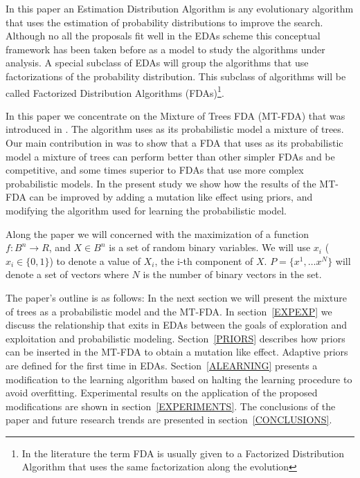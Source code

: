 \documentclass[runningheads]{llncs}
\begin{document}
 In this paper  an
   Estimation Distribution Algorithm is any evolutionary algorithm
    that uses the estimation of probability distributions to improve
    the search. Although no all the
   proposals fit well in the EDAs scheme this conceptual framework has been taken before
   \cite{Larranhaga_et_Lozano:2001}
    as a model to study the algorithms  under analysis. A special subclass of EDAs will group the
    algorithms that use factorizations of the probability
    distribution. This subclass of algorithms will be called Factorized
    Distribution Algorithms (FDAs)\footnote{In the literature the term FDA
    is usually given to a Factorized Distribution
    Algorithm that uses the same factorization along the evolution}.


In this paper we concentrate on the  Mixture of Trees FDA (MT-FDA) that was
 introduced in \cite{Santana_et_al:2001b}. The
 algorithm uses as its probabilistic model a mixture of trees. Our main contribution in \cite{Santana_et_al:2001b} was to show that a FDA that uses
as its probabilistic model a  mixture of trees can perform better than other simpler
FDAs and be competitive, and some times superior to FDAs that use more complex
probabilistic models. In the present study we show how the results of the MT-FDA can
 be improved by adding a mutation like effect using priors, and modifying
 the algorithm used for learning the probabilistic model.


 Along the paper we will concerned with the
 maximization of a function $f: B^n \rightarrow R$,  and  $X \in  B^n$  is a set
 of random binary variables. We will use $x_i$ ($x_i \in \{0,1\}$) to denote a
value of $X_i$, the i-th component of $X$.  $P=\{x^1,\ldots x^N\}$ will
 denote a set of vectors where $N$ is the number of binary
 vectors in the set.
 
 The paper's outline is as follows: In the next section we will present the mixture of trees as a probabilistic
model and the MT-FDA. In section~\ref{EXPEXP} we discuss the relationship that
exits in EDAs between the goals of
exploration and exploitation and probabilistic
modeling. Section~\ref{PRIORS} describes how priors can be inserted in the
MT-FDA to obtain a mutation like effect. Adaptive priors are defined for the
first time in EDAs. Section~\ref{ALEARNING} presents a modification to the learning
algorithm based on halting the learning procedure to avoid overfitting. Experimental results on the application of the proposed
modifications  are shown in section~\ref{EXPERIMENTS}. The conclusions of the paper and  future research trends
are presented in section~\ref{CONCLUSIONS}.
\end{document}
